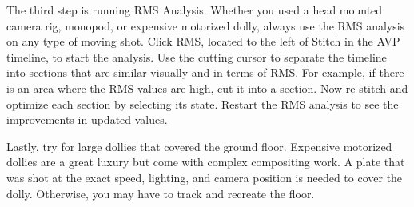 \begin{fullwidth}




\clearpage
The third step is running RMS Analysis. Whether you used a head mounted camera rig, monopod, or expensive motorized dolly, always use the RMS analysis on any type of moving shot. Click RMS, located to the left of Stitch in the AVP timeline, to start the analysis. Use the cutting cursor to separate the timeline into sections that are similar visually and in terms of RMS. For example, if there is an area where the RMS values are high, cut it into a section. Now re-stitch and optimize each section by selecting its state. Restart the RMS analysis to see the improvements in updated values.


Lastly, try \textbf{} for large dollies that covered the ground floor. Expensive motorized dollies are a great luxury but come with complex compositing work. A plate that was shot at the exact speed, lighting, and camera position is needed to cover the dolly. Otherwise, you may have to track and recreate the floor.


\clearpage
\end{fullwidth}